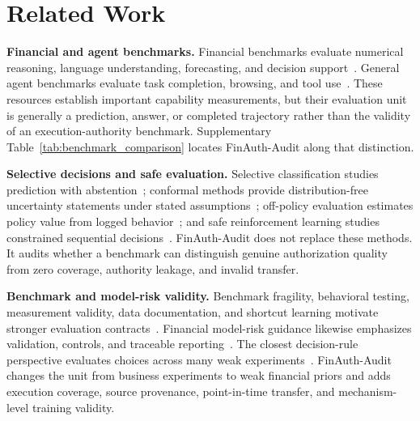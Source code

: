 \section{Related Work}

\textbf{Financial and agent benchmarks.} Financial benchmarks evaluate numerical reasoning, language understanding, forecasting, and decision support~\cite{chen2021finqa,xie2023pixiu,xie2024finben,wu2023bloomberggpt,liu2021finrl}. General agent benchmarks evaluate task completion, browsing, and tool use~\cite{liu2023agentbench,zhou2023webarena,qin2023toolllm,mialon2023gaia,yao2023react}. These resources establish important capability measurements, but their evaluation unit is generally a prediction, answer, or completed trajectory rather than the validity of an execution-authority benchmark. Supplementary Table~\ref{tab:benchmark_comparison} locates FinAuth-Audit along that distinction.

\textbf{Selective decisions and safe evaluation.} Selective classification studies prediction with abstention~\cite{elyaniv2010foundations,geifman2017selective}; conformal methods provide distribution-free uncertainty statements under stated assumptions~\cite{vovk2005algorithmic,shafer2008tutorial,angelopoulos2021gentle}; off-policy evaluation estimates policy value from logged behavior~\cite{dudik2011doubly,jiang2016doubly,thomas2016data}; and safe reinforcement learning studies constrained sequential decisions~\cite{garcia2015comprehensive,tamar2015policy}. FinAuth-Audit does not replace these methods. It audits whether a benchmark can distinguish genuine authorization quality from zero coverage, authority leakage, and invalid transfer.

\textbf{Benchmark and model-risk validity.} Benchmark fragility, behavioral testing, measurement validity, data documentation, and shortcut learning motivate stronger evaluation contracts~\cite{dehghani2021benchmark,kiela2021dynabench,ribeiro2020checklist,jacobs2021measurement,gebru2021datasheets,sambasivan2021data,geirhos2020shortcut}. Financial model-risk guidance likewise emphasizes validation, controls, and traceable reporting~\cite{board2011sr117,bis2013principles}. The closest decision-rule perspective evaluates choices across many weak experiments~\cite{chou2025weakrules,bibaut2024covariance,tripuraneni2024choosing}. FinAuth-Audit changes the unit from business experiments to weak financial priors and adds execution coverage, source provenance, point-in-time transfer, and mechanism-level training validity.
